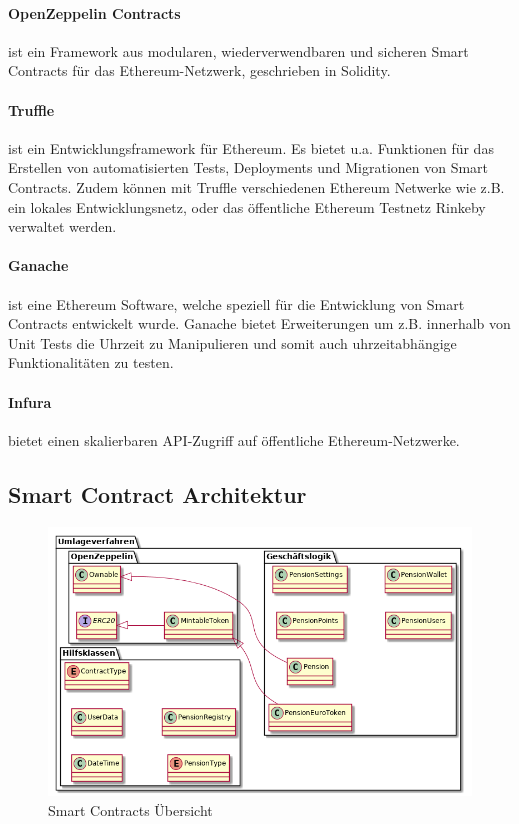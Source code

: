 \paragraph*{OpenZeppelin Contracts} ist ein Framework aus modularen, wiederverwendbaren und sicheren Smart Contracts für das Ethereum-Netzwerk, geschrieben in Solidity.

\paragraph*{Truffle} ist ein Entwicklungsframework für Ethereum. Es bietet u.a. Funktionen für das Erstellen von automatisierten Tests, Deployments und Migrationen von Smart Contracts. Zudem können mit Truffle verschiedenen Ethereum Netwerke wie z.B. ein lokales Entwicklungsnetz, oder das öffentliche Ethereum Testnetz Rinkeby verwaltet werden.

\paragraph*{Ganache} ist eine Ethereum Software, welche speziell für die Entwicklung von Smart Contracts entwickelt wurde. Ganache bietet Erweiterungen um z.B. innerhalb von Unit Tests die Uhrzeit zu Manipulieren und somit auch uhrzeitabhängige Funktionalitäten zu testen.

\paragraph*{Infura} bietet einen skalierbaren API-Zugriff auf öffentliche Ethereum-Netzwerke.


\subsection{Smart Contract Architektur}

\begin{figure}[H]
    \centering
    \includegraphics[width=6.0in]{images/classdiagram-smartcontracts.png}
    \caption{Smart Contracts Übersicht}
    \label{fig:asure_architecture}
\end{figure}


